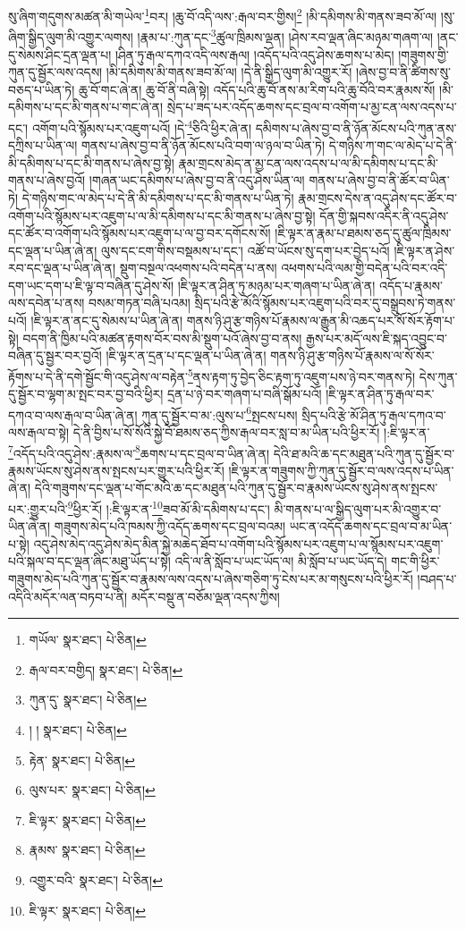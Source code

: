 སུ་ཞིག་གདུགས་མཚན་མི་གཡེལ་\footnote{གཡོལ་  སྣར་ཐང་།  པེ་ཅིན། }བར། །ཆུ་བོ་འདི་ལས་:རྒལ་བར་གྱིས།\footnote{རྒལ་བར་བགྱིད།  སྣར་ཐང་།  པེ་ཅིན། } །མི་དམིགས་མི་གནས་ཟབ་མོ་ལ། །སུ་ཞིག་སྒྱིད་ལུག་མི་འགྱུར་ལགས། །རྣམ་པ་:ཀུན་དང་\footnote{ཀུན་དུ་  སྣར་ཐང་།  པེ་ཅིན། }ཚུལ་ཁྲིམས་ལྡན། །ཤེས་རབ་ལྡན་ཞིང་མཉམ་གཞག་ལ། །ནང་དུ་སེམས་ཤིང་དྲན་ལྡན་པ། །ཤིན་ཏུ་རྒལ་དཀའ་འདི་ལས་རྒལ། །འདོད་པའི་འདུ་ཤེས་ཆགས་པ་མེད། །གཟུགས་གྱི་ཀུན་དུ་སྦྱོར་ལས་འདས། །མི་དམིགས་མི་གནས་ཟབ་མོ་ལ། །དེ་ནི་སྒྱིད་ལུག་མི་འགྱུར་རོ། །ཞེས་བྱ་བ་ནི་ཚིགས་སུ་བཅད་པ་ཡིན་ཏེ། ཆུ་བོ་གང་ཞེ་ན། ཆུ་བོ་ནི་བཞི་སྟེ། འདོད་པའི་ཆུ་བོ་ནས་མ་རིག་པའི་ཆུ་བོའི་བར་རྣམས་སོ། །མི་དམིགས་པ་དང་མི་གནས་པ་གང་ཞེ་ན། སྲེད་པ་ཟད་པར་འདོད་ཆགས་དང་བྲལ་བ་འགོག་པ་མྱ་ངན་ལས་འདས་པ་དང་། འགོག་པའི་སྙོམས་པར་འཇུག་པའོ། །དེ་\footnote{། །  སྣར་ཐང་།  པེ་ཅིན། }ཅིའི་ཕྱིར་ཞེ་ན། དམིགས་པ་ཞེས་བྱ་བ་ནི་ཉོན་མོངས་པའི་ཀུན་ནས་དཀྲིས་པ་ཡིན་ལ། གནས་པ་ཞེས་བྱ་བ་ནི་ཉོན་མོངས་པའི་བག་ལ་ཉལ་བ་ཡིན་ཏེ། དེ་གཉིས་ཀ་གང་ལ་མེད་པ་དེ་ནི་མི་དམིགས་པ་དང་མི་གནས་པ་ཞེས་བྱ་སྟེ། རྣམ་གྲངས་མེད་ན་མྱ་ངན་ལས་འདས་པ་ལ་མི་དམིགས་པ་དང་མི་གནས་པ་ཞེས་བྱའོ། །གཞན་ཡང་དམིགས་པ་ཞེས་བྱ་བ་ནི་འདུ་ཤེས་ཡིན་ལ། གནས་པ་ཞེས་བྱ་བ་ནི་ཚོར་བ་ཡིན་ཏེ། དེ་གཉིས་གང་ལ་མེད་པ་དེ་ནི་མི་དམིགས་པ་དང་མི་གནས་པ་ཡིན་ཏེ། རྣམ་གྲངས་དེས་ན་འདུ་ཤེས་དང་ཚོར་བ་འགོག་པའི་སྙོམས་པར་འཇུག་པ་ལ་མི་དམིགས་པ་དང་མི་གནས་པ་ཞེས་བྱ་སྟེ། དོན་གྱི་སྐབས་འདིར་ནི་འདུ་ཤེས་དང་ཚོར་བ་འགོག་པའི་སྙོམས་པར་འཇུག་པ་ལ་བྱ་བར་དགོངས་སོ། །ཇི་ལྟར་ན་རྣམ་པ་ཐམས་ཅད་དུ་ཚུལ་ཁྲིམས་དང་ལྡན་པ་ཡིན་ཞེ་ན། ལུས་དང་ངག་གིས་བསྡམས་པ་དང་། འཚོ་བ་ཡོངས་སུ་དག་པར་བྱེད་པའོ། །ཇི་ལྟར་ན་ཤེས་རབ་དང་ལྡན་པ་ཡིན་ཞེ་ན། སྡུག་བསྔལ་འཕགས་པའི་བདེན་པ་ནས། འཕགས་པའི་ལམ་གྱི་བདེན་པའི་བར་འདི་དག་ཡང་དག་པ་ཇི་ལྟ་བ་བཞིན་དུ་ཤེས་སོ། །ཇི་ལྟར་ན་ཤིན་ཏུ་མཉམ་པར་གཞག་པ་ཡིན་ཞེ་ན། འདོད་པ་རྣམས་ལས་དབེན་པ་ནས། བསམ་གཏན་བཞི་པའམ། སྲིད་པའི་རྩེ་མོའི་སྙོམས་པར་འཇུག་པའི་བར་དུ་བསྒྲུབས་ཏེ་གནས་པའོ། །ཇི་ལྟར་ན་ནང་དུ་སེམས་པ་ཡིན་ཞེ་ན། གནས་ཉི་ཤུ་རྩ་གཉིས་པོ་རྣམས་ལ་རྒྱུན་མི་འཆད་པར་སོ་སོར་རྟོག་པ་སྟེ། བདག་ནི་ཁྱིམ་པའི་མཚན་རྟགས་བོར་བས་མི་སྡུག་པའོ་ཞེས་བྱ་བ་ནས། རྒྱས་པར་མདོ་ལས་ཇི་སྐད་འབྱུང་བ་བཞིན་དུ་སྦྱར་བར་བྱའོ། །ཇི་ལྟར་ན་དྲན་པ་དང་ལྡན་པ་ཡིན་ཞེ་ན། གནས་ཉི་ཤུ་རྩ་གཉིས་པོ་རྣམས་ལ་སོ་སོར་རྟོགས་པ་དེ་ནི་དགེ་སྦྱོང་གི་འདུ་ཤེས་ལ་བརྟེན་\footnote{རྟེན་  སྣར་ཐང་།  པེ་ཅིན། }ནས་རྟག་ཏུ་བྱེད་ཅིང་རྟག་ཏུ་འཇུག་པས་ཉེ་བར་གནས་ཏེ། དེས་ཀུན་དུ་སྦྱོར་བ་ལྷག་མ་སྤང་བར་བྱ་བའི་ཕྱིར། དྲན་པ་ཉེ་བར་གཞག་པ་བཞི་སྒོམ་པའོ། །ཇི་ལྟར་ན་ཤིན་ཏུ་རྒལ་བར་དཀའ་བ་ལས་རྒལ་བ་ཡིན་ཞེ་ན། ཀུན་དུ་སྦྱོར་བ་མ་:ལུས་པ་\footnote{ལུས་པར་  སྣར་ཐང་།  པེ་ཅིན། }སྤངས་པས། སྲིད་པའི་རྩེ་མོ་ཤིན་ཏུ་རྒལ་དཀའ་བ་ལས་རྒལ་བ་སྟེ། དེ་ནི་བྱིས་པ་སོ་སོའི་སྐྱེ་བོ་ཐམས་ཅད་ཀྱིས་རྒལ་བར་སླ་བ་མ་ཡིན་པའི་ཕྱིར་རོ། །:ཇི་ལྟར་ན་\footnote{ཇི་ལྟར་  སྣར་ཐང་།  པེ་ཅིན། }འདོད་པའི་འདུ་ཤེས་:རྣམས་ལ་\footnote{རྣམས་  སྣར་ཐང་།  པེ་ཅིན། }ཆགས་པ་དང་བྲལ་བ་ཡིན་ཞེ་ན། དེའི་ཐ་མའི་ཆ་དང་མཐུན་པའི་ཀུན་དུ་སྦྱོར་བ་རྣམས་ཡོངས་སུ་ཤེས་ནས་སྤངས་པར་གྱུར་པའི་ཕྱིར་རོ། །ཇི་ལྟར་ན་གཟུགས་ཀྱི་ཀུན་དུ་སྦྱོར་བ་ལས་འདས་པ་ཡིན་ཞེ་ན། དེའི་གཟུགས་དང་ལྡན་པ་གོང་མའི་ཆ་དང་མཐུན་པའི་ཀུན་དུ་སྦྱོར་བ་རྣམས་ཡོངས་སུ་ཤེས་ནས་སྤངས་པར་:གྱུར་པའི་\footnote{འགྱུར་བའི་  སྣར་ཐང་།  པེ་ཅིན། }ཕྱིར་རོ། །:ཇི་ལྟར་ན་\footnote{ཇི་ལྟར་  སྣར་ཐང་།  པེ་ཅིན། }ཟབ་མོ་མི་དམིགས་པ་དང་། མི་གནས་པ་ལ་སྒྱིད་ལུག་པར་མི་འགྱུར་བ་ཡིན་ཞེ་ན། གཟུགས་མེད་པའི་ཁམས་ཀྱི་འདོད་ཆགས་དང་བྲལ་བའམ། ཡང་ན་འདོད་ཆགས་དང་བྲལ་བ་མ་ཡིན་པ་སྟེ། འདུ་ཤེས་མེད་འདུ་ཤེས་མེད་མིན་སྐྱེ་མཆེད་ཐོབ་པ་འགོག་པའི་སྙོམས་པར་འཇུག་པ་ལ་སྙོམས་པར་འཇུག་པའི་སྐལ་བ་དང་ལྡན་ཞིང་མཐུ་ཡོད་པ་སྟེ། འདི་ལ་ནི་སློབ་པ་ཡང་ཡོད་ལ། མི་སློབ་པ་ཡང་ཡོད་དེ། གང་གི་ཕྱིར་གཟུགས་མེད་པའི་ཀུན་དུ་སྦྱོར་བ་རྣམས་ལས་འདས་པ་ཞེས་གཅིག་ཏུ་ངེས་པར་མ་གསུངས་པའི་ཕྱིར་རོ། །བཤད་པ་འདིའི་མདོར་ལན་བཏབ་པ་ནི། མདོར་བསྡུ་ན་བཅོམ་ལྡན་འདས་ཀྱིས། 